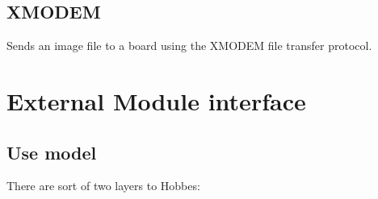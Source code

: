 \documentclass[12pt,letterpaper]{article}
\begin{document}
%
%
\subsection{XMODEM}
\label{2.9}

Sends an image file to a board using the XMODEM file transfer protocol.



%
%
\section{External Module interface}
\label{3}

\setcounter{subsection}{-1}



%
%
\subsection{Use model}
\label{3.0}

There are sort of two layers to Hobbes:
\end{document}
